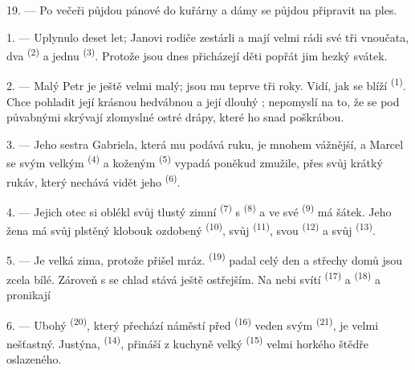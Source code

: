 19. --- Po večeři půjdou pánové do kuřárny a dámy se půjdou připravit na ples.

\VUsaut{5.0mm}
\VUsaut{1.6mm}
\VUsaut{2.6mm}

\VUsaut{3.0mm}

1. --- Uplynulo deset let; Janovi rodiče zestárli a mají velmi rádi své tři vnoučata, dva
 \textsuperscript{(2)} a jednu  \textsuperscript{(3)}. Protože
jsou dnes  přicházejí děti popřát jim hezký svátek.

2. --- Malý Petr je ještě velmi malý; jsou mu teprve tři roky. Vidí, jak se blíží
 \textsuperscript{(1)}. Chce pohladit její krásnou hedvábnou
 a její dlouhý ; nepomyslí na to, že se pod půvabnými
 skrývají zlomyslné ostré drápy, které ho snad poškrábou.

3. --- Jeho sestra Gabriela, která mu podává ruku, je mnohem vážnější, a Marcel se svým velkým
 \textsuperscript{(4)} a koženým  \textsuperscript{(5)} vypadá
poněkud zmužile, přes svůj krátký rukáv, který nechává vidět jeho 
\textsuperscript{(6)}.

4. --- Jejich otec si oblékl svůj tlustý zimní  \textsuperscript{(7)} s
 \textsuperscript{(8)} a ve své
 \textsuperscript{(9)} má šátek. Jeho žena má svůj plstěný klobouk
ozdobený  \textsuperscript{(10)}, svůj  \textsuperscript{(11)},
svou  \textsuperscript{(12)} a svůj
 \textsuperscript{(13)}.

5. --- Je velká zima, protože přišel mráz.  \textsuperscript{(19)} padal celý den
a střechy domů jsou zcela bílé. Zároveň s  se chlad stává ještě ostřejším. Na
nebi svítí  \textsuperscript{(17)} a  \textsuperscript{(18)} a
pronikají 

\VUsaut{4.2mm}
\VUsaut{3.0mm}

6. --- Ubohý  \textsuperscript{(20)}, který přechází náměstí před
 \textsuperscript{(16)} veden svým 
\textsuperscript{(21)}, je velmi nešťastný. Justýna,  \textsuperscript{(14)},
přináší z kuchyně velký  \textsuperscript{(15)} velmi horkého
 štědře oslazeného.

